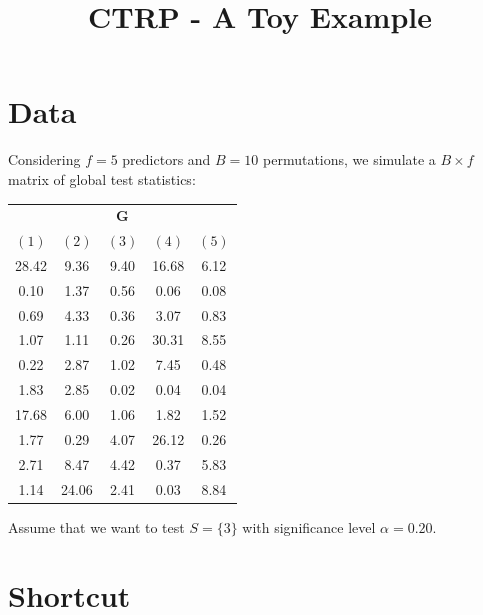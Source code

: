 \documentclass[11pt,a4paper,openright,twoside]{article}
\title{CTRP - A Toy Example}
\author{}
\date{}
\begin{document}
\maketitle

\section{Data}
Considering $f=5$ predictors and $B=10$ permutations, we simulate a $B\times f$ matrix of global test statistics:

\begin{table}[h!]
\centering
\begin{tabular}{ccccc}
\multicolumn{5}{c}{$\mathbf{G}$}\\
$(1)$ & $(2)$ & $(3)$ & $(4)$ & $(5)$\\
\cline{1-5}
28.42 & 9.36 & 9.40 & 16.68 & 6.12\\
0.10 & 1.37 & 0.56 & 0.06 & 0.08\\
0.69 & 4.33 & 0.36 & 3.07 & 0.83\\
1.07 & 1.11 & 0.26 & 30.31 & 8.55\\
0.22 & 2.87 & 1.02 & 7.45 & 0.48\\
1.83 & 2.85 & 0.02 & 0.04 & 0.04\\
17.68 & 6.00 & 1.06 & 1.82 & 1.52\\
1.77 & 0.29 & 4.07 & 26.12 & 0.26\\
2.71 & 8.47 & 4.42 & 0.37 & 5.83\\
1.14 & 24.06 & 2.41 & 0.03 & 8.84
\end{tabular}
\end{table}

Assume that we want to test $S=\{3\}$ with significance level $\alpha=0.20$.




\vspace{10mm}
\section{Shortcut}
\begin{table}[h!]
\centering
{}
\caption{Supersets of $S=\{3\}$, having sizes $|V|=1+v$ with $v=0,\ldots,4$. The sets in bold are used to define the lower critical value $L_v$.}
\end{table}
\end{document}
